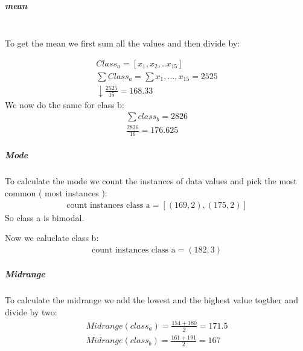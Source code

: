 \documentclass{article}
\newcommand{\subparaheading}[1]{\subparagraph{#1} \mbox{}}
\begin{document}
	\subparaheading{mean} \\
	To get the mean we first sum all the values and then divide by:
	
	\begin{align*}
		Class_a=[x_1,x_2,..x_{15}] \\
		\sum Class_a = \sum x_1,...,x_{15} = 2525 \\↓
		\frac{2525}{15} = 168.33
	\end{align*}
	We now do the same for class b:
	\begin{align*}
		\sum class_b = 2826 \\
		\frac{2826}{16} = 176.625
	\end{align*}
	
	\subparaheading{Mode}
	To calculate the mode we count the instances of data values and pick the most common ( most instances ):
	\begin{align*}
		\text{count instances class a} = [(169, 2), (175, 2)]
	\end{align*}
	So class a is bimodal.
	
	Now we caluclate class b:
	\begin{align*}
		\text{count instances class a} = (182,3)
	\end{align*}
	
	\subparaheading{Midrange}
	To calculate the midrange we add the lowest and the highest value togther and divide by two:
	\begin{align}
	Midrange(class_a) = \frac{154+180}{2} = 171.5 \\
	Midrange(class_b) = \frac{161+191}{2} = 167
	\end{align}
\end{document}
